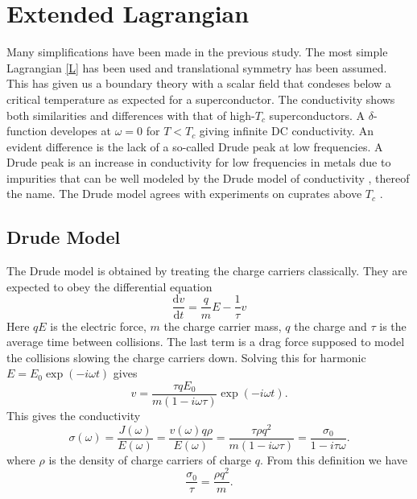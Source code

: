 \documentclass[12pt]{report}
\renewcommand{\d}{\ensuremath{\mathrm{d}}}
\renewcommand{\i}{\ensuremath{i}}
\begin{document}
\chapter{Extended Lagrangian\label{higherOrder}}
Many simplifications have been made in the previous study. The most simple Lagrangian \eqref{L} has been used and translational symmetry has been assumed. This has given us a boundary theory with a scalar field that condeses below a critical temperature as expected for a superconductor. The conductivity shows both similarities and differences with that of high-$T_c$ superconductors. A $\delta$-function developes at $\omega=0$ for $T<T_c$ giving infinite DC conductivity. An evident difference is the lack of a so-called Drude peak at low frequencies. A Drude peak is an increase in conductivity for low frequencies in metals due to impurities that can be well modeled by the Drude model of conductivity \cite{drude}, thereof the name. The Drude model agrees with experiments on cuprates above $T_c$ \cite{drudeFit}.

\section{Drude Model}
The Drude model is obtained by treating the charge carriers classically. They are expected to obey the differential equation
\begin{equation}
 \frac{\d v}{\d t}=\frac{q}{m}E-\frac{1}{\tau}v
\end{equation}
Here $qE$ is the electric force, $m$ the charge carrier mass, $q$ the charge and $\tau$ is the average time between collisions. The last term is a drag force supposed to model the collisions slowing the charge carriers down. Solving this for harmonic $E=E_0\exp(-\i\omega t)$ gives 
\begin{equation}
 v=\frac{\tau qE_0}{m(1-\i\omega\tau)}\exp(-\i\omega t).
\end{equation}
This gives the conductivity
\begin{equation}
 \sigma(\omega)=\frac{J(\omega)}{E(\omega)}=\frac{v(\omega)q\rho}{E(\omega)}=\frac{\tau\rho q^2}{m(1-\i\omega\tau)}=\frac{\sigma_0}{1-\i\tau\omega}.
\end{equation}
where $\rho$ is the density of charge carriers of charge $q$. From this definition we have
\begin{equation}
 \frac{\sigma_0}{\tau}=\frac{\rho q^2}{m}.
\end{equation}
\end{document}
